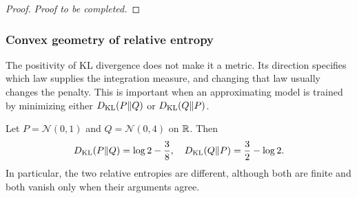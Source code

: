\documentclass[12pt,a4paper,oneside]{book}
\begin{document}
\begin{proof}
\noindent\textit{Proof to be completed.}
\end{proof}

\subsubsection{Convex geometry of relative entropy}
The positivity of KL divergence does not make it a metric. Its direction
specifies which law supplies the integration measure, and changing that law
usually changes the penalty. This is important when an approximating model
is trained by minimizing either $D_{\mathrm{KL}}(P\Vert Q)$ or $D_{\mathrm{KL}}(Q\Vert P)$.

\begin{proposition}
\label{prop:kl-asymmetry}
\label{src:p11q2}
Let $P=\mathcal N(0,1)$ and $Q=\mathcal N(0,4)$ on $\mathbb{R}$. Then
\begin{equation*}
D_{\mathrm{KL}}(P\Vert Q)=\log 2-\frac38,
 \quad
 D_{\mathrm{KL}}(Q\Vert P)=\frac32-\log 2.
\end{equation*}
In particular, the two relative entropies are different, although
both are finite and both vanish only when their arguments agree.
\end{proposition}
\end{document}
